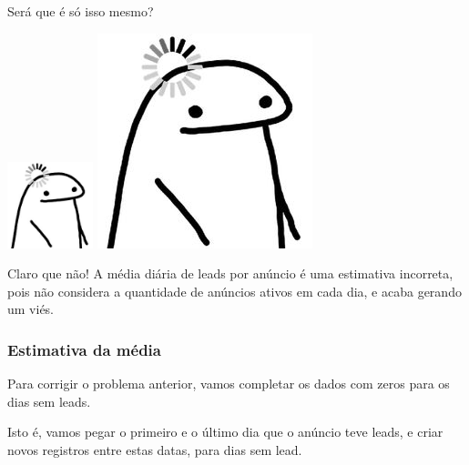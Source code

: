 \documentclass[
]{article}
\let\oldincludegraphics\includegraphics
\renewcommand{\includegraphics}[2][]{ \ifthenelse{ \equal{#1}{} } { \oldincludegraphics[width=2.5cm,height=2.5cm,keepaspectratio=true]{#2} } { \oldincludegraphics[#1]{#2} } }
\begin{document}
Será que é só isso mesmo?

\includegraphics{./images/flork-pensando.jpg}

Claro que não! A média diária de leads por anúncio é uma estimativa
incorreta, pois não considera a quantidade de anúncios ativos em cada
dia, e acaba gerando um viés.

\subsubsection{Estimativa da média}\label{estimativa-da-muxe9dia}

Para corrigir o problema anterior, vamos completar os dados com zeros
para os dias sem leads.

Isto é, vamos pegar o primeiro e o último dia que o anúncio teve leads,
e criar novos registros entre estas datas, para dias sem lead.
\end{document}
